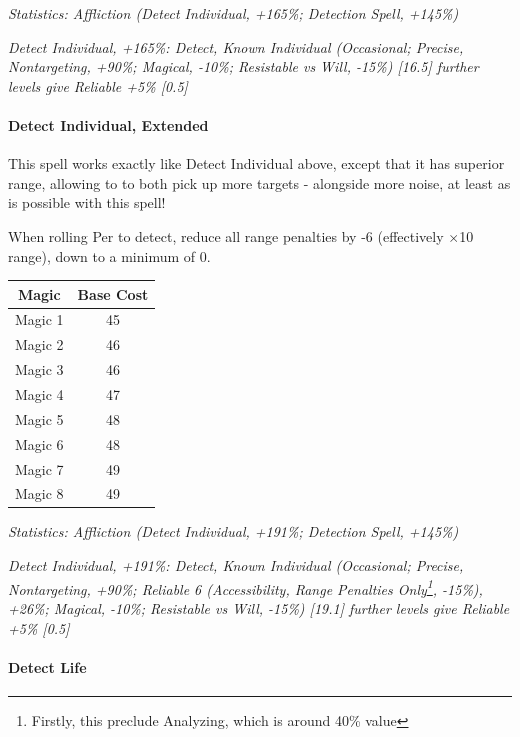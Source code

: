 \begin{multicols*}{3}
	\textcolor{OliveGreen}{\textit{ Statistics: Affliction (Detect Individual, +165\%; Detection Spell, +145\%) }}
	
	\textcolor{OliveGreen}{\textit{Detect Individual, +165\%: Detect, Known Individual (Occasional; Precise, Nontargeting, +90\%; Magical, -10\%; Resistable vs Will, -15\%) [16.5] further levels give Reliable +5\% [0.5]}}
	
	\paragraph{Detect Individual, Extended}
	
	This spell works exactly like Detect Individual above, except that it has superior range, allowing to to both pick up more targets - alongside more noise, at least as is possible with this spell!
	
	When rolling Per to detect, reduce all range penalties by -6 (effectively $\times$10 range), down to a minimum of 0.
	
	\begin{center}
		\begin{tabular}{|c|c|}
			\hline
			Magic & Base Cost \\
			\hline
			\hline
			Magic 1 & 45 \\
			Magic 2 & 46 \\
			Magic 3 & 46 \\
			Magic 4 & 47 \\
			Magic 5 & 48 \\
			Magic 6 & 48 \\
			Magic 7 & 49 \\
			Magic 8 & 49 \\
			\hline
		\end{tabular}
	\end{center} 
	
	\textcolor{OliveGreen}{\textit{ Statistics: Affliction (Detect Individual, +191\%; Detection Spell, +145\%) }}
	
	\textcolor{OliveGreen}{\textit{Detect Individual, +191\%: Detect, Known Individual (Occasional; Precise, Nontargeting, +90\%; Reliable 6 (Accessibility, Range Penalties Only\footnote{Firstly, this preclude Analyzing, which is around 40\% value}, -15\%), +26\%; Magical, -10\%; Resistable vs Will, -15\%) [19.1] further levels give Reliable +5\% [0.5]}}
	
	\paragraph{Detect Life}
		

\end{multicols*}
